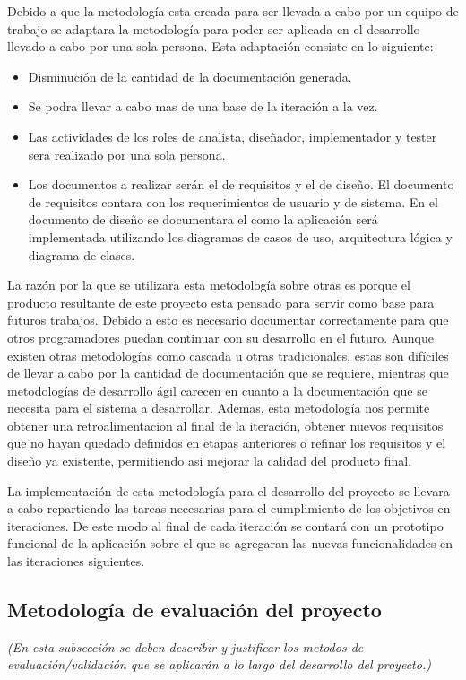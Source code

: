 \documentclass[11pt,letterpaper]{article}
\begin{document}
Debido a que la metodología esta creada para ser llevada a cabo por un equipo de trabajo se adaptara la metodología para poder ser aplicada en el desarrollo llevado a cabo por una sola persona. Esta adaptación consiste en lo siguiente:
\begin{itemize}
	\item Disminución de la cantidad de la documentación generada.
	\item Se podra llevar a cabo mas de una base de la iteración a la vez.
	\item Las actividades de los roles de analista, diseñador, implementador y tester sera realizado por una sola persona.
	\item  Los documentos a realizar serán el de requisitos y el de diseño. El documento de requisitos contara con los requerimientos de usuario y de sistema. En el documento de diseño se documentara el como la aplicación será implementada utilizando los diagramas de casos de uso, arquitectura lógica y diagrama de clases.
\end{itemize}
La razón por la que se utilizara esta metodología sobre otras es porque el producto resultante de este proyecto esta pensado para servir como base para futuros trabajos. Debido a esto es necesario documentar correctamente para que otros programadores puedan continuar con su desarrollo en el futuro. Aunque existen otras metodologías como cascada u otras tradicionales, estas son difíciles de llevar a cabo por la cantidad de documentación que se requiere, mientras que metodologías de desarrollo ágil carecen en cuanto a la documentación que se necesita para el sistema a desarrollar. Ademas, esta metodología nos permite obtener una retroalimentacion al final de la iteración, obtener nuevos requisitos que no hayan quedado definidos en etapas anteriores o refinar los requisitos y el diseño ya existente, permitiendo asi mejorar la calidad del producto final.

La implementación de esta metodología para el desarrollo del proyecto se llevara a cabo repartiendo las tareas necesarias para el cumplimiento de los objetivos en iteraciones. De este modo al final de cada iteración se contará con un prototipo funcional de la aplicación sobre el que se agregaran las nuevas funcionalidades en las iteraciones siguientes.

\subsection{Metodología de evaluación del proyecto}
\emph{(En esta subsección se deben describir y justificar los metodos de evaluación/validación que se aplicarán a lo largo del desarrollo del proyecto.)}
\end{document}
